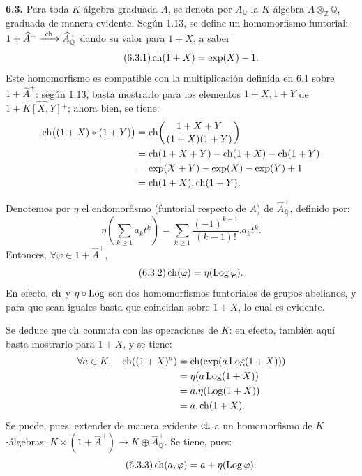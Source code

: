 \textbf{6.3.} Para toda \(K\)-álgebra graduada \(A\), se denota por \(A_{\mathbb Q}\) la \(K\)-álgebra \(A\otimes_{\mathbb Z}\mathbb Q\), graduada de manera evidente. Según 1.13, se define un homomorfismo funtorial: \(1+\widehat A^+\xrightarrow{\ \ch\ }\widehat A_{\mathbb Q}^{+}\) dando su valor para \(1+X\), a saber
\begin{equation}\tag{6.3.1}
  \operatorname{ch}(1+X)=\exp(X)-1.
\end{equation}
Este homomorfismo es compatible con la multiplicación definida en 6.1 sobre \(1+\widehat A^+\): según 1.13, basta mostrarlo para los elementos \(1+X,1+Y\) de \(1+\widehat{K[X,Y]}{}^{+}\); ahora bien, se tiene:
\[
\begin{aligned}
 \operatorname{ch}\bigl((1+X)*(1+Y)\bigr)
 &= \operatorname{ch}\!\left(\frac{1+X+Y}{(1+X)(1+Y)}\right)\\
 &= \operatorname{ch}(1+X+Y)-\operatorname{ch}(1+X)-\operatorname{ch}(1+Y)\\
 &= \exp(X+Y)-\exp(X)-\exp(Y)+1\\
 &= \operatorname{ch}(1+X).\operatorname{ch}(1+Y).
\end{aligned}
\]

Denotemos por \(\eta\) el endomorfismo (funtorial respecto de \(A\)) de \(\widehat A_{\mathbb Q}^{+}\), definido por:
\[
 \eta\!\left(\sum_{k\ge1} a_k t^k\right)
 =
 \sum_{k\ge1}\frac{(-1)^{k-1}}{(k-1)!}.a_k t^k.
\]
Entonces, \(\forall\varphi\in1+\widehat A^+\),
\begin{equation}\tag{6.3.2}
  \operatorname{ch}(\varphi)=\eta(\operatorname{Log}\varphi).
\end{equation}
En efecto, \(\operatorname{ch}\) y \(\eta\circ\operatorname{Log}\) son dos homomorfismos funtoriales de grupos abelianos, y para que sean iguales basta que coincidan sobre \(1+X\), lo cual es evidente.

Se deduce que \(\operatorname{ch}\) conmuta con las operaciones de \(K\): en efecto, también aquí basta mostrarlo para \(1+X\), y se tiene:
\[
\begin{aligned}
 \forall a\in K,\quad\operatorname{ch}((1+X)^a)
 &=\operatorname{ch}(\exp(a\operatorname{Log}(1+X)))\\
 &=\eta(a\operatorname{Log}(1+X))\\
 &=a.\eta(\operatorname{Log}(1+X))\\
 &=a.\operatorname{ch}(1+X).
\end{aligned}
\]
Se puede, pues, extender de manera evidente \(\operatorname{ch}\) a un homomorfismo de \(K\)-álgebras: \(K\times(1+\widehat A^+)\longrightarrow K\oplus\widehat A_{\mathbb Q}^{+}\). Se tiene, pues:
\begin{equation}\tag{6.3.3}
  \operatorname{ch}(a,\varphi)=a+\eta(\operatorname{Log}\varphi).
\end{equation}

